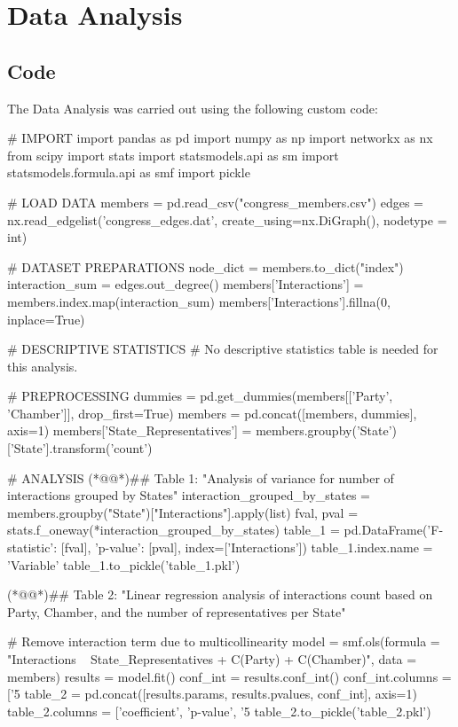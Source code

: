 \documentclass[11pt]{article}
\begin{document}
\section{Data Analysis}
\subsection{{Code}}
The Data Analysis was carried out using the following custom code:

\begin{python}

# IMPORT
import pandas as pd
import numpy as np
import networkx as nx
from scipy import stats
import statsmodels.api as sm
import statsmodels.formula.api as smf
import pickle

# LOAD DATA
members = pd.read_csv("congress_members.csv")
edges = nx.read_edgelist('congress_edges.dat', create_using=nx.DiGraph(), nodetype = int)

# DATASET PREPARATIONS
node_dict = members.to_dict("index")
interaction_sum = edges.out_degree()
members['Interactions'] = members.index.map(interaction_sum)
members['Interactions'].fillna(0, inplace=True)

# DESCRIPTIVE STATISTICS
# No descriptive statistics table is needed for this analysis.

# PREPROCESSING
dummies = pd.get_dummies(members[['Party', 'Chamber']], drop_first=True)
members = pd.concat([members, dummies], axis=1)
members['State_Representatives'] = members.groupby('State')['State'].transform('count')

# ANALYSIS
(*@@*)## Table 1: "Analysis of variance for number of interactions grouped by States"
interaction_grouped_by_states = members.groupby("State")["Interactions"].apply(list)
fval, pval = stats.f_oneway(*interaction_grouped_by_states)
table_1 = pd.DataFrame({'F-statistic': [fval], 'p-value': [pval]}, index=['Interactions'])
table_1.index.name = 'Variable'
table_1.to_pickle('table_1.pkl')

(*@@*)## Table 2: "Linear regression analysis of interactions count based on Party, Chamber, and the number of representatives per State"

# Remove interaction term due to multicollinearity
model = smf.ols(formula = "Interactions ~ State_Representatives + C(Party) + C(Chamber)", data = members)
results = model.fit()
conf_int = results.conf_int()
conf_int.columns = ['5%
table_2 = pd.concat([results.params, results.pvalues, conf_int], axis=1)
table_2.columns = ['coefficient', 'p-value', '5%
table_2.to_pickle('table_2.pkl')


\end{python}
\end{document}
